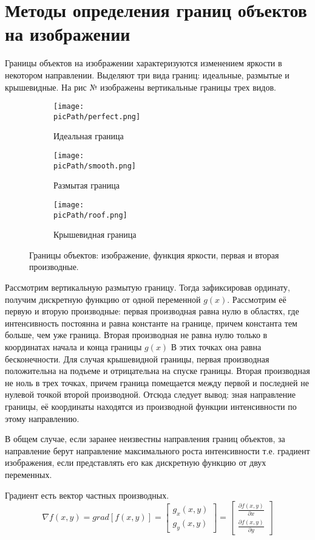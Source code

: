 \documentclass[oneside,final,14pt]{extreport}
\newcommand{\picPath}{pictures}
\begin{document}
\chapter{Методы определения границ объектов на изображении}
Границы объектов на изображении характеризуются изменением яркости в некотором направлении. Выделяют три вида границ: идеальные,  размытые  и крышевидные. На рис № изображены вертикальные границы трех видов.

\begin{figure}[h!]
  \centering
  \begin{subfigure}[b]{0.4\linewidth}
    \texttt{[image: \\picPath/perfect.png]}
    \caption{ Идеальная граница}
  \end{subfigure}
  \begin{subfigure}[b]{0.4\linewidth}
    \texttt{[image: \\picPath/smooth.png]}
    \caption{Размытая граница}
  \end{subfigure}
  \begin{subfigure}[b]{0.4\linewidth}
    \texttt{[image: \\picPath/roof.png]}
    \caption{Крышевидная граница}
  \end{subfigure}
  \caption{Границы объектов: изображение, функция яркости, первая и вторая производные.}
  \label{fig:coffee}
\end{figure}

Рассмотрим вертикальную размытую границу. Тогда зафиксировав ординату, получим дискретную функцию от одной переменной $g(x)$. Рассмотрим её первую и вторую производные: первая производная равна нулю в областях, где интенсивность постоянна и равна константе на границе, причем константа тем больше, чем уже граница. Вторая производная не равна нулю только в координатах начала и конца границы $g(x)$ В этих точках она равна бесконечности. Для случая крышевидной границы, первая производная положительна на подъеме и отрицательна на спуске границы. Вторая производная не ноль в трех точках, причем граница помещается между первой и последней не нулевой точкой второй производной. Отсюда следует вывод: зная направление границы, её координаты находятся из производной функции интенсивности по этому направлению. 
 
В общем случае, если заранее неизвестны направления границ объектов, за направление берут направление максимального роста интенсивности  т.е. градиент изображения, если представлять его как дискретную функцию от двух переменных. 

Градиент есть вектор частных производных.
\begin{equation}
\nabla f(x,y) 
= 
grad[f(x,y)]
=
\begin{bmatrix}
g_x(x,y)\\
g_y(x,y)
\end{bmatrix}
=
\begin{bmatrix}
\frac{\partial f(x,y)}
{\partial x}\\
\frac{\partial f(x,y)}
{\partial y}
\end{bmatrix}
\end{equation}
\end{document}
